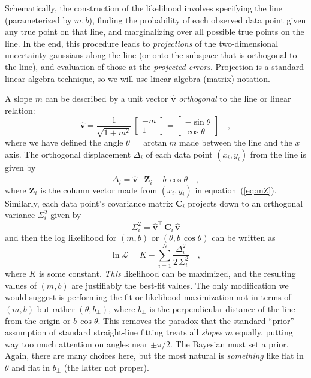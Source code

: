 \documentclass[12pt]{article}
\newcommand{\equationname}{equation}
\newcommand{\mmatrix}[1]{\boldsymbol{#1}}
\newcommand{\transpose}[1]{{#1}^{\scriptscriptstyle \top}}
\newcommand{\mC}{\mmatrix{C}}
\newcommand{\mZ}{\mmatrix{Z}}
\newcommand{\vhat}{\mmatrix{\hat{v}}}
\newcommand{\like}{\mathscr{L}}
\newcommand{\bperp}{b_{\perp}}
\begin{document}
Schematically, the construction of the likelihood involves specifying
the line (parameterized by $m,b$), finding the probability of each
observed data point given any true point on that line, and
marginalizing over all possible true points on the line.  In the end,
this procedure leads to \emph{projections} of the two-dimensional
uncertainty gaussians along the line (or onto the subspace that is
orthogonal to the line), and evaluation of those at the
\emph{projected errors}.  Projection is a standard linear algebra
technique, so we will use linear algebra (matrix) notation.

A slope $m$ can be described by a unit vector $\vhat$
\emph{orthogonal} to the line or linear relation:
\begin{equation}
\vhat
 = \frac{1}{\sqrt{1+m^2}}\,\left[\begin{array}{c}-m\\1\end{array}\right]
 = \left[\begin{array}{c}-\sin\theta\\\cos\theta\end{array}\right] \quad ,
\end{equation}
where we have defined the angle $\theta = \arctan m$ made between the
line and the $x$ axis.  The orthogonal displacement $\Delta_i$ of each
data point $(x_i,y_i)$ from the line is given by
\begin{equation}
\Delta_i = \transpose{\vhat}\,\mZ_i - b\,\cos\theta \quad ,
\end{equation}
where $\mZ_i$ is the column vector made from $(x_i,y_i)$ in
\equationname~(\ref{eq:mZ}).  Similarly, each data point's covariance
matrix $\mC_i$ projects down to an orthogonal variance $\Sigma_i^2$ given by
\begin{equation}\label{eq:Sigma}
\Sigma_i^2 = \transpose{\vhat}\,\mC_i\,\vhat
\end{equation}
and then the log likelihood for $(m,b)$ or $(\theta,b\,\cos\theta)$
can be written as
\begin{equation}\label{eq:twodlike}
\ln\like = K - \sum_{i=1}^N \frac{\Delta_i^2}{2\,\Sigma_{i}^2} \quad ,
\end{equation}
where $K$ is some constant.  \emph{This} likelihood can be maximized,
and the resulting values of $(m,b)$ are justifiably the best-fit
values.  The only modification we would suggest is performing the fit
or likelihood maximization not in terms of $(m,b)$ but rather
$(\theta,\bperp)$, where $\bperp$ is the perpendicular distance of the
line from the origin or $b\,\cos\theta$.  This removes the paradox
that the standard ``prior'' assumption of standard straight-line
fitting treats all \emph{slopes} $m$ equally, putting way too much
attention on angles near $\pm\pi/2$.  The Bayesian must set a prior.
Again, there are many choices here, but the most natural is
\emph{something} like flat in $\theta$ and flat in $\bperp$ (the
latter not proper).
\end{document}
